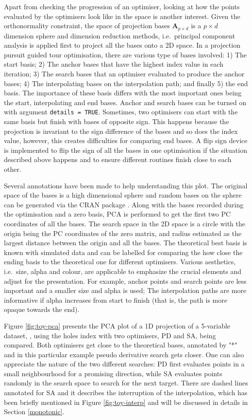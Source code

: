 Apart from checking the progression of an optimiser, looking at how the
points evaluated by the optimisers look like in the space is another
interest. Given the orthonormality constraint, the space of projection
bases \(\mathbf{A}_{p \times d}\) is a \(p \times d\) dimension sphere
and dimension reduction methods, i.e.~principal component analysis is
applied first to project all the bases onto a 2D space. In a projection
pursuit guided tour optimisation, there are various type of bases
involved: 1) The start basis; 2) The anchor bases that have the highest
index value in each iteration; 3) The search bases that an optimiser
evaluated to produce the anchor bases; 4) The interpolating bases on the
interpolation path; and finally 5) the end basis. The importance of
these basis differs with the most important ones being the start,
interpolating and end bases. Anchor and search bases can be turned on
with argument \texttt{details\ =\ TRUE}. Sometimes, two optimisers can
start with the same basis but finish with bases of opposite sign. This
happens because the projection is invariant to the sign difference of
the bases and so does the index value, however, this creates
difficulties for comparing end bases. A flip sign device is implemented
to flip the sign of all the bases in one optimisation if the situation
described above happens and to ensure different routines finish close to
each other.

Several annotations have been made to help understanding this plot. The
original space of the bases is a high dimensional sphere and random
bases on the sphere can be generated via the CRAN package
 \citep{geozoo}. Along with the bases recorded during
the optimisation and a zero basis, PCA is performed to get the first two
PC coordinates of all the bases. The search space in the 2D space is a
circle with the origin being the PC coordinates of the zero matrix, and
radius estimated as the largest distance between the origin and all the
bases. The theoretical best basis is known with simulated data and can
be labelled for comparing the how close the ending basis to the
theoretical one for different optimisers. Various aesthetics, i.e.~size,
alpha and colour, are applicable to emphasize the crucial elements and
adjust for the presentation. For example, anchor points and search
points are less important and a smaller size and alpha is used; The
interpolation paths are more informative if alpha increases from start
to finish (that is, the path is more opaque towards the end).

Figure \ref{fig:toy-pca} presents the PCA plot of a 1D projection of a
5-variable dataset, , using the holes index with two
optimisers, PD and SA, being compared. Both optimisers get close to the
theoretical bases, annotated by "*" and in this particular example
pseudo derivative search gets closer. One can also appreciate the nature
of the two different searches: PD first evaluates points in a small
neighbourhood for a promising direction, while SA evaluates points
randomly in the search space to search for the next target. There are
dashed lines annotated for SA and it describes the interruption of the
interpolation, which has been briefly mentioned in Figure
\ref{fig:toy-interp} and will be discussed in details in Section
\ref{monotonic}.

